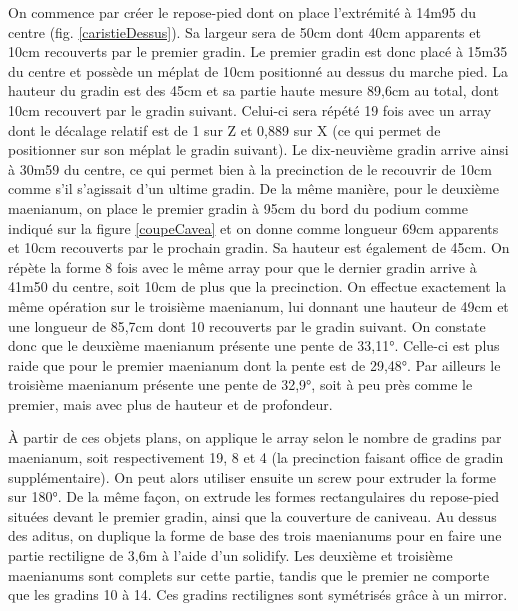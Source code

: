 On commence par créer le repose-pied dont on place l'extrémité à 14m95 du centre (fig. \ref{caristieDessus}). Sa largeur sera de 50cm dont 40cm apparents et 10cm recouverts par le premier gradin. Le premier gradin est donc placé à 15m35 du centre et possède un méplat de 10cm positionné au dessus du marche pied. La hauteur du gradin est des 45cm et sa partie haute mesure 89,6cm au total, dont 10cm recouvert par le gradin suivant. Celui-ci sera répété 19 fois avec un \gls{array} dont le décalage relatif est de 1 sur Z et 0,889 sur X (ce qui permet de positionner sur son méplat le gradin suivant). Le dix-neuvième gradin arrive ainsi à 30m59 du centre, ce qui permet bien à la \gls{precinction} de le recouvrir de 10cm comme s'il s'agissait d'un ultime gradin. De la même manière, pour le deuxième \gls{maenianum}, on place le premier gradin à 95cm du bord du \gls{podium} comme indiqué sur la figure \ref{coupeCavea} et on donne comme longueur 69cm apparents et 10cm recouverts par le prochain gradin. Sa hauteur est également de 45cm. On répète la forme 8 fois avec le même \gls{array} pour que le dernier gradin arrive à 41m50 du centre, soit 10cm de plus que la  \gls{precinction}. On effectue exactement la même opération sur le troisième \gls{maenianum}, lui donnant une hauteur de 49cm et une longueur de 85,7cm dont 10 recouverts par le gradin suivant. On constate donc que le deuxième \gls{maenianum} présente une pente de 33,11°. Celle-ci est plus raide que pour le premier \gls{maenianum} dont la pente est de 29,48°. Par ailleurs le troisième \gls{maenianum} présente une pente de 32,9°, soit à peu près comme le premier, mais avec plus de hauteur et de profondeur.

\`{A} partir de ces objets plans, on applique le \gls{array} selon le nombre de gradins par \gls{maenianum}, soit respectivement 19, 8 et 4 (la \gls{precinction} faisant office de gradin supplémentaire). On peut alors utiliser ensuite un \gls{screw} pour extruder la forme sur 180°. De la même façon, on extrude les formes rectangulaires du repose-pied situées devant le premier gradin, ainsi que la couverture de caniveau. Au dessus des \gls{aditus}, on duplique la forme de base des trois \glspl{maenianum} pour en faire une partie rectiligne de 3,6m à l'aide d'un \gls{solidify}. Les deuxième et troisième \glspl{maenianum} sont complets sur cette partie, tandis que le premier ne comporte que les gradins 10 à 14. Ces gradins rectilignes sont symétrisés grâce à un \gls{mirror}.

